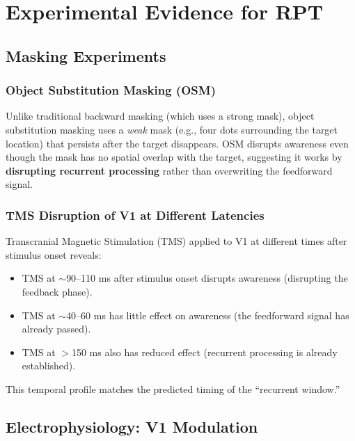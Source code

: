 \documentclass[11pt,a4paper]{report}
\begin{document}
\chapter{Experimental Evidence for RPT}

\section{Masking Experiments}

\subsection{Object Substitution Masking (OSM)}

Unlike traditional backward masking (which uses a strong mask), object substitution masking uses a \emph{weak} mask (e.g., four dots surrounding the target location) that persists after the target disappears. OSM disrupts awareness even though the mask has no spatial overlap with the target, suggesting it works by \textbf{disrupting recurrent processing} rather than overwriting the feedforward signal.

\subsection{TMS Disruption of V1 at Different Latencies}

Transcranial Magnetic Stimulation (TMS) applied to V1 at different times after stimulus onset reveals:
\begin{itemize}[leftmargin=1.5em]
  \item TMS at $\sim$90--110 ms after stimulus onset disrupts awareness (disrupting the feedback phase).
  \item TMS at $\sim$40--60 ms has little effect on awareness (the feedforward signal has already passed).
  \item TMS at $>$150 ms also has reduced effect (recurrent processing is already established).
\end{itemize}

This temporal profile matches the predicted timing of the ``recurrent window.''

\section{Electrophysiology: V1 Modulation}
\end{document}
